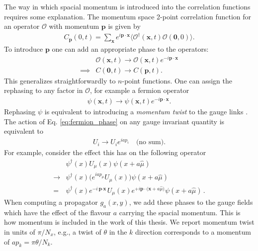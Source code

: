 The way in which spacial momentum is introduced into the correlation functions requires some explanation. The momentum space 2-point correlation function for an operator $\mathcal{O}$ with momentum ${\textbf{p}}$ is given by
\begin{align}
  C_{\textbf{p}}(0,t) = \sum_{{\textbf{x}}} e^{i{\textbf{p}}\cdot{\textbf{x}}} \langle \mathcal{O}^{\dagger} ({\textbf{x}},t) \mathcal{O}({\textbf{0}},0) \rangle.
\end{align}
To introduce ${\textbf{p}}$ one can add an appropriate phase to the operators:
\begin{align}
  \label{eq:phirephase}
  &\mathcal{O}({\textbf{x}},t) \rightarrow \mathcal{O}({\textbf{x}},t)e^{-i{\textbf{p}}\cdot{\textbf{x}}} \\
  \implies &C({\textbf{0}},t) \rightarrow C({\textbf{p}},t).
\end{align}
This generalizes straightforwardly to $n$-point functions. One can assign the rephasing to any factor in $\mathcal{O}$, for example a fermion operator
\begin{align}
  \psi({\textbf{x}},t) \rightarrow \psi({\textbf{x}},t)e^{-i{\textbf{p}}\cdot{\textbf{x}}}.
  \label{eq:fermion_phase}
\end{align}
Rephasing $\psi$ is equivalent to introducing a {\it{momentum twist}} to the gauge links \cite{Guadagnoli:2005be}. The action of Eq. \eqref{eq:fermion_phase} on any gauge invariant quantity is equivalent to
\begin{align}
  U_i \rightarrow U_i e^{iap_i}\quad\text{(no sum)}.
  \label{eq:twist}
\end{align}
For example, consider the effect this has on the following operator
\begin{align}
  \nonumber
  &\psi^{\dagger}(x) U_{\mu}(x) \psi(x+a\hat{\mu}) \\
  \nonumber
  \rightarrow &\psi^{\dagger}(x) \big( e^{iap_{\mu}}U_{\mu}(x) \big) \psi(x+a\hat{\mu})
  \\
  = &\psi^{\dagger}(x)e^{-i{\textbf{p}\cdot\textbf{x}}}U_{\mu}(x) e^{+i{\textbf{p}\cdot(\textbf{x}}+a\hat{\mu})}\psi(x+a\hat{\mu})\,.
\end{align}
When computing a propagator $g_a(x,y)$, we add these phases to the gauge fields which have the effect of the flavour $a$ carrying the spacial momentum. This is how momentum is included in the work of this thesis. We report momentum twist in units of $\pi/N_x$, e.g., a twist of $\theta$ in the $k$ direction corresponds to a momentum of $ap_k = \pi\theta/N_k$.

